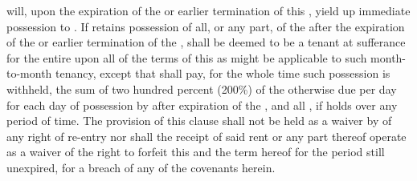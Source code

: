 \lessee will, upon the expiration of the \termOfLease or earlier termination of this \lease, yield up immediate possession to \lessor. If \lessee retains possession of all, or any part, of the \premises after the expiration of the \termOfLease or earlier termination of the \lease, \lessee shall be deemed to be a tenant at sufferance for the entire \premises upon all of the terms of this \lease as might be applicable to such month-to-month tenancy, except that \lessee shall pay, for the whole time such possession is withheld, the sum of two hundred percent (200\%) of the \baseMonthlyRent otherwise due per day for each day of possession by \lessee after expiration of the \termOfLease, and all \additionalRent, if \lessee holds over any period of time. The provision of this clause shall not be held as a waiver by \lessor of any right of re-entry nor shall the receipt of said rent or any part thereof operate as a waiver of the right to forfeit this \lease and the term hereof for the period still unexpired, for a breach of any of the covenants herein.
